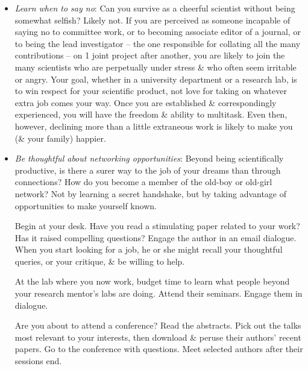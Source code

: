\documentclass{article}
\begin{document}
\begin{enumerate}
\begin{itemize}
\begin{itemize}
			Here is another example: Suppose, as a junior faculty member or starting lab scientist, you are asked to serve on a committee of a national scientific society. Should you say yes? The answer depends on anticipated work load. Decline if the job will be so burdensome that it stands in the way of your producing new science at an acceptable rate. You may win esteem by serving on a national committee \& may well build a network of influential colleagues there, but at crunch time (e.g., when you come up for tenure), you will be judged by your scientific output before anything else. Once you have won permanent employment in the research community, you can serve on all the committees you want. Not before.
			\item {\it Learn when to say no}: Can you survive as a cheerful scientist without being somewhat selfish? Likely not. If you are perceived as someone incapable of saying no to committee work, or to becoming associate editor of a journal, or to being the lead investigator -- the one responsible for collating all the many contributions -- on 1 joint project after another, you are likely to join the many scientists who are perpetually under stress \& who often seem irritable or angry. Your goal, whether in a university department or a research lab, is to win respect for your scientific product, not love for taking on whatever extra job comes your way. Once you are established \& correspondingly experienced, you will have the freedom \& ability to multitask. Even then, however, declining more than a little extraneous work is likely to make you (\& your family) happier.
			\item {\it Be thoughtful about networking opportunities}: Beyond being scientifically productive, is there a surer way to the job of your dreams than through connections? How do you become a member of the old-boy or old-girl network? Not by learning a secret handshake, but by taking advantage of opportunities to make yourself known.

			Begin at your desk. Have you read a stimulating paper related to your work? Has it raised compelling questions? Engage the author in an email dialogue. When you start looking for a job, he or she might recall your thoughtful queries, or your critique, \& be willing to help.

			At the lab where you now work, budget time to learn what people beyond your research mentor's labs are doing. Attend their seminars. Engage them in dialogue.

			Are you about to attend a conference? Read the abstracts. Pick out the talks most relevant to your interests, then download \& peruse their authors' recent papers. Go to the conference with questions. Meet selected authors after their sessions end.


\end{itemize}
\end{itemize}
\end{enumerate}
\end{document}
